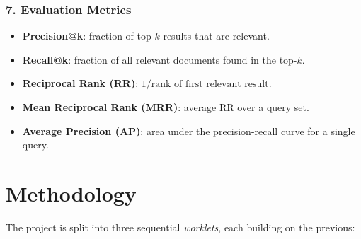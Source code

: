 \documentclass[12pt]{article}
\begin{document}
\subsubsection*{7. Evaluation Metrics}
\begin{itemize}
    \item \textbf{Precision@k}: fraction of top-$k$ results that are relevant.
    \item \textbf{Recall@k}: fraction of all relevant documents found in the top-$k$.
    \item \textbf{Reciprocal Rank (RR)}: $1/\text{rank of first relevant result}$.
    \item \textbf{Mean Reciprocal Rank (MRR)}: average RR over a query set.
    \item \textbf{Average Precision (AP)}: area under the precision-recall curve for a single query.
\end{itemize}

\section*{Methodology}

The project is split into three sequential \emph{worklets}, each building on the previous:
\end{document}
